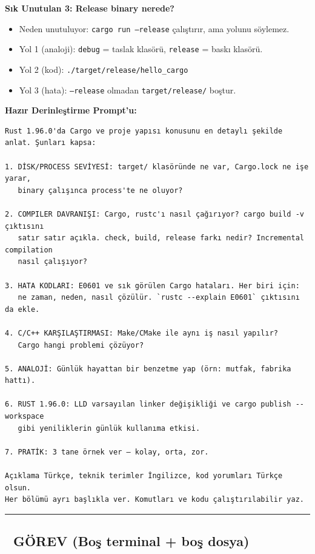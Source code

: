 \documentclass[12pt,a4paper]{article}
\begin{document}
\textbf{Sık Unutulan 3: Release binary nerede?}

\begin{itemize}
\tightlist
\item
  Neden unutuluyor: \texttt{cargo\ run\ --release} çalıştırır, ama yolunu söylemez.
\item
  Yol 1 (analoji): \texttt{debug} = taslak klasörü, \texttt{release} = baskı klasörü.
\item
  Yol 2 (kod): \texttt{./target/release/hello\_cargo}
\item
  Yol 3 (hata): \texttt{--release} olmadan \texttt{target/release/} boştur.
\end{itemize}

\textbf{Hazır Derinleştirme Prompt'u:}

\begin{verbatim}
Rust 1.96.0'da Cargo ve proje yapısı konusunu en detaylı şekilde anlat. Şunları kapsa:

1. DİSK/PROCESS SEVİYESİ: target/ klasöründe ne var, Cargo.lock ne işe yarar,
   binary çalışınca process'te ne oluyor?

2. COMPILER DAVRANIŞI: Cargo, rustc'ı nasıl çağırıyor? cargo build -v çıktısını
   satır satır açıkla. check, build, release farkı nedir? Incremental compilation
   nasıl çalışıyor?

3. HATA KODLARI: E0601 ve sık görülen Cargo hataları. Her biri için:
   ne zaman, neden, nasıl çözülür. `rustc --explain E0601` çıktısını da ekle.

4. C/C++ KARŞILAŞTIRMASI: Make/CMake ile aynı iş nasıl yapılır?
   Cargo hangi problemi çözüyor?

5. ANALOJİ: Günlük hayattan bir benzetme yap (örn: mutfak, fabrika hattı).

6. RUST 1.96.0: LLD varsayılan linker değişikliği ve cargo publish --workspace
   gibi yeniliklerin günlük kullanıma etkisi.

7. PRATİK: 3 tane örnek ver — kolay, orta, zor.

Açıklama Türkçe, teknik terimler İngilizce, kod yorumları Türkçe olsun.
Her bölümü ayrı başlıkla ver. Komutları ve kodu çalıştırılabilir yaz.
\end{verbatim}

\begin{center}\rule{0.5\linewidth}{0.5pt}\end{center}

\subsection{📝 GÖREV (Boş terminal + boş dosya)}\label{görev-boş-terminal-boş-dosya}
\end{document}
